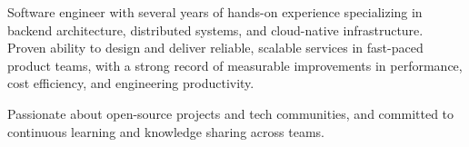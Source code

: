 

\begin{cvparagraph}

Software engineer with several years of hands-on experience specializing in backend architecture, distributed systems, and cloud-native infrastructure. Proven ability to design and deliver reliable, scalable services in fast-paced product teams, with a strong record of measurable improvements in performance, cost efficiency, and engineering productivity.

Passionate about open-source projects and tech communities, and committed to continuous learning and knowledge sharing across teams.
\end{cvparagraph}

